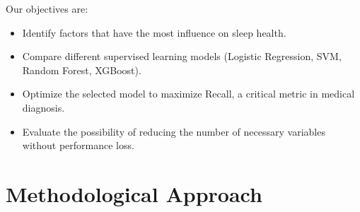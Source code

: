 \documentclass[12pt,a4paper]{article}
\begin{document}
    Our objectives are:
    \begin{itemize}
        \item Identify factors that have the most influence on sleep health.
        \item Compare different supervised learning models (Logistic Regression, SVM, Random Forest, XGBoost).
        \item Optimize the selected model to maximize Recall, a critical metric in medical diagnosis.
        \item Evaluate the possibility of reducing the number of necessary variables without performance loss.
    \end{itemize}

    \section{Methodological Approach}
\end{document}
